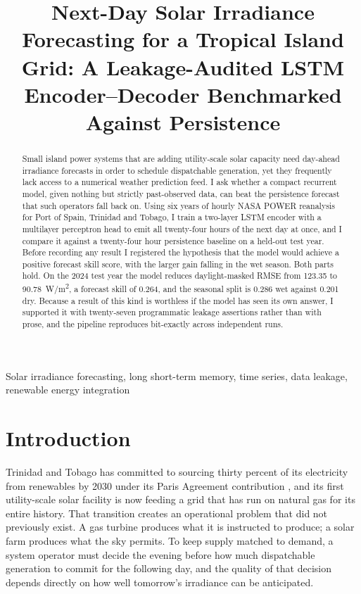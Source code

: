 \documentclass{article}
\title{Next-Day Solar Irradiance Forecasting for a Tropical Island Grid:
A Leakage-Audited LSTM Encoder--Decoder Benchmarked Against Persistence}
\begin{document}
\ninept
\maketitle

\begin{abstract}
Small island power systems that are adding utility-scale solar capacity need
day-ahead irradiance forecasts in order to schedule dispatchable generation, yet
they frequently lack access to a numerical weather prediction feed. I ask whether
a compact recurrent model, given nothing but strictly past-observed data, can
beat the persistence forecast that such operators fall back on. Using six years
of hourly NASA POWER reanalysis for Port of Spain, Trinidad and Tobago, I train a
two-layer LSTM encoder with a multilayer perceptron head to emit all twenty-four
hours of the next day at once, and I compare it against a twenty-four hour
persistence baseline on a held-out test year. Before recording any result I
registered the hypothesis that the model would achieve a positive forecast skill
score, with the larger gain falling in the wet season. Both parts hold. On the
2024 test year the model reduces daylight-masked RMSE from 123.35 to
90.78~W/m\textsuperscript{2}, a forecast skill of 0.264, and the seasonal split
is 0.286 wet against 0.201 dry. Because a result of this kind is worthless if the
model has seen its own answer, I supported it with twenty-seven programmatic
leakage assertions rather than with prose, and the pipeline reproduces
bit-exactly across independent runs.
\end{abstract}

\begin{keywords}
Solar irradiance forecasting, long short-term memory, time series, data leakage,
renewable energy integration
\end{keywords}

\section{Introduction}

Trinidad and Tobago has committed to sourcing thirty percent of its electricity
from renewables by 2030 under its Paris Agreement contribution
\cite{gott2021tt}, and its first utility-scale solar facility is now feeding a
grid that has run on natural gas for its entire history. That transition creates
an operational problem that did not previously exist. A gas turbine produces what
it is instructed to produce; a solar farm produces what the sky permits. To keep
supply matched to demand, a system operator must decide the evening before how
much dispatchable generation to commit for the following day, and the quality of
that decision depends directly on how well tomorrow's irradiance can be
anticipated.
\end{document}
